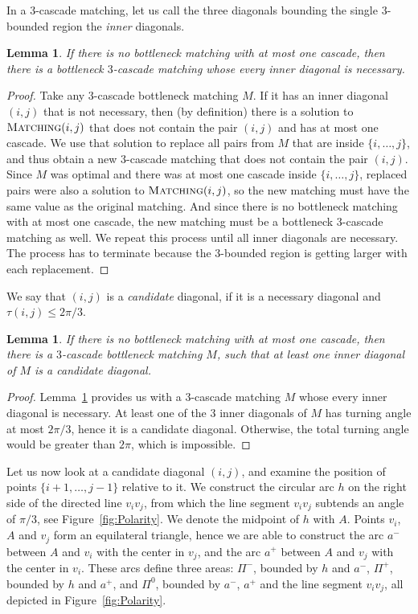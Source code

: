 \documentclass[a4paper, 11pt]{article}
\newtheorem{lemma}[theorem]{Lemma}
\newcommand{\p}[2]{\{#1, \ldots, #2\}}
\newcommand{\pij}{\p{i}{j}}
\newcommand{\Matching}{\textsc{Matching}}
\begin{document}
In a $3$-cascade matching, let us call the three diagonals bounding the single $3$-bounded region the \emph{inner} diagonals.

\begin{lemma}
	\label{lem:BottleneckWithAllNecessary}
	If there is no bottleneck matching with at most one cascade, then there is a bottleneck $3$-cascade matching whose every inner diagonal is necessary.
\end{lemma}
\begin{proof}
	Take any $3$-cascade bottleneck matching $M$. If it has an inner diagonal $(i,j)$ that is not necessary, then (by definition) there is a solution to $\Matching(i,j)$ that does not contain the pair $(i,j)$ and has at most one cascade. We use that solution to replace all pairs from $M$ that are inside $\pij$, and thus obtain a new $3$-cascade matching that does not contain the pair $(i,j)$. Since $M$ was optimal and there was at most one cascade inside $\pij$, replaced pairs were also a solution to $\Matching(i,j)$, so the new matching must have the same value as the original matching. And since there is no bottleneck matching with at most one cascade, the new matching must be a bottleneck $3$-cascade matching as well. We repeat this process until all inner diagonals are necessary. The process has to terminate because the $3$-bounded region is getting larger with each replacement.
\end{proof}

We say that $(i,j)$ is a \emph{candidate} diagonal, if it is a necessary diagonal and $\tau(i,j) \leq 2\pi/3$.

\begin{lemma}
	\label{lem:BottleneckWithCandidate}
	If there is no bottleneck matching with at most one cascade, then there is a $3$-cascade bottleneck matching $M$, such that at least one inner diagonal of $M$ is a candidate diagonal.
\end{lemma}
\begin{proof}
	Lemma~\ref{lem:BottleneckWithAllNecessary} provides us with a $3$-cascade matching $M$ whose every inner diagonal is necessary. At least one of the $3$ inner diagonals of $M$ has turning angle at most $2\pi/3$, hence it is a candidate diagonal. Otherwise, the total turning angle would be greater than $2\pi$, which is impossible.
\end{proof}
	
	
Let us now look at a candidate diagonal $(i,j)$, and examine the position of points $\p{i+1}{j-1}$ relative to it. We construct the circular arc $h$ on the right side of the directed line $v_iv_j$, from which the line segment $v_iv_j$ subtends an angle of $\pi/3$, see Figure~\ref{fig:Polarity}. We denote the midpoint of $h$ with $A$. Points $v_i$, $A$ and $v_j$ form an equilateral triangle, hence we are able to construct the arc $a^-$ between $A$ and $v_i$ with the center in $v_j$, and the arc $a^+$ between $A$ and $v_j$ with the center in $v_i$. These arcs define three areas: $\Pi^-$, bounded by $h$ and $a^-$, $\Pi^+$, bounded by $h$ and $a^+$, and $\Pi^0$, bounded by $a^-$, $a^+$ and the line segment $v_iv_j$, all depicted in Figure~\ref{fig:Polarity}.
\end{document}
